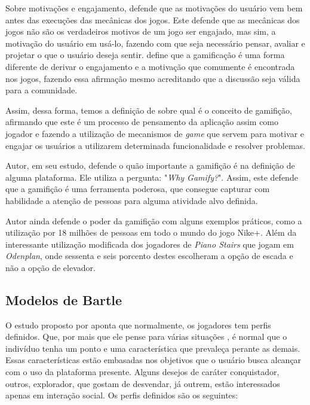 Sobre motivações e engajamento, \cite{chou2015actionable}  defende que as motivações
do usuário vem bem antes das execuções das mecânicas dos jogos. Este defende
que as mecânicas dos jogos não são os verdadeiros motivos de um jogo ser
engajado, mas sim, a motivação do usuário em usá-lo, fazendo com que seja
necessário pensar, avaliar e projetar o que o usuário deseja sentir. \cite{chou2015actionable} define que a gamificação é uma forma diferente de derivar o engajamento
e a motivação  que comumente é encontrada nos jogos, fazendo essa afirmação
mesmo acreditando que a discussão seja válida para a comunidade.

Assim, dessa forma, temos a definição de \cite{zichermann2011gamification} sobre qual é o conceito de
gamifição, afirmando que este é um processo de pensamento da aplicação assim
como jogador e fazendo a utilização
de mecanismos de \textit{game} que servem para motivar e engajar os usuários a utilizarem
determinada funcionalidade e resolver problemas.

Autor, em seu estudo, defende o quão importante a gamifição é na definição
de alguma plataforma. Ele utiliza a pergunta: "\textit{Why Gamify?}". Assim, este defende
que a gamifição é uma ferramenta poderosa, que consegue capturar com habilidade
a atenção de pessoas para alguma atividade alvo definida.

Autor ainda defende  o poder da gamifição com alguns exemplos práticos,
como a utilização por 18 milhões de pessoas em todo o mundo do jogo Nike+.
Além da interessante utilização modificada dos jogadores de
\textit{Piano Stairs} que jogam em \textit{Odenplan}, onde sessenta e seis porcento destes
escolheram a opção de escada e não a opção de elevador.

\subsection{Modelos de Bartle}
\label{sub:modeloBartle}
O estudo proposto por \cite{bartle1996hearts} aponta que normalmente, os jogadores
tem perfis definidos. Que, por mais que ele pense para várias situações
, é normal que o indivíduo tenha um ponto e uma característica que prevaleça
perante as demais. Essas características estão embasadas nos objetivos
que o usuário  busca alcançar com o uso da plataforma presente.
Alguns desejos de caráter conquistador, outros, explorador, que gostam
de desvendar, já outrem, estão interessados apenas em interação
social. Os perfis definidos são os seguintes:



